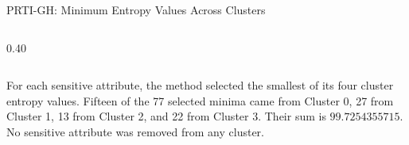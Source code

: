 \documentclass[9pt]{beamer}
\begin{document}
\begin{frame}[t]{PRTI-GH: Minimum Entropy Values Across Clusters}
\begin{columns}[T,onlytextwidth]
\begin{column}{0.40\textwidth}
            \vspace{0.15cm}
        \end{column}
    \end{columns}

    \vspace{0.28cm}
    \begin{minipage}{0.96\textwidth}
        \scriptsize
        For each sensitive attribute, the method selected the smallest of
        its four cluster entropy values. Fifteen of the 77 selected minima
        came from Cluster 0, 27 from Cluster 1, 13 from Cluster 2, and 22
        from Cluster 3. Their sum is $99.7254355715$. No sensitive attribute
        was removed from any cluster.
    \end{minipage}
\end{frame}
\end{document}
